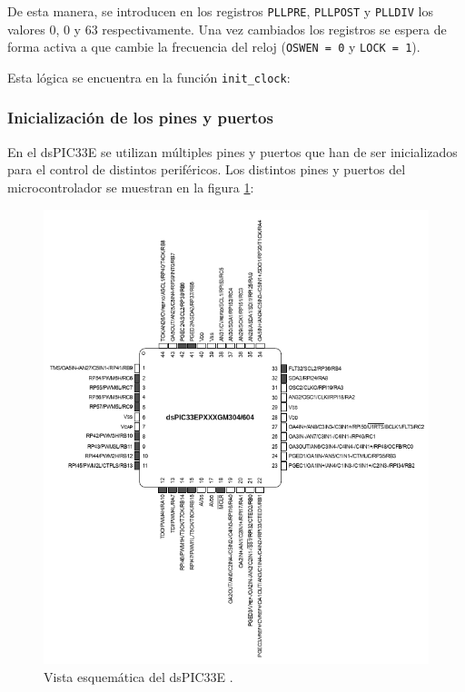 De esta manera, se introducen en los registros \texttt{PLLPRE}, \texttt{PLLPOST} y
\texttt{PLLDIV} los valores $0$, $0$ y $63$ respectivamente. Una vez cambiados los
registros se espera de forma activa a que cambie la frecuencia del reloj
(\texttt{OSWEN = 0} y \texttt{LOCK = 1}).

Esta lógica se encuentra en la función \texttt{init\_clock}:


\subsubsection{Inicialización de los pines y puertos}
En el dsPIC33E se utilizan múltiples pines y puertos que han de ser inicializados para
el control de distintos periféricos. Los distintos pines y puertos del microcontrolador
se muestran en la figura \ref{fig:dspic33e_upper}:

\begin{figure}[H]
    \centering
    \includegraphics[width=\linewidth]{pictures/dspic33e_upper.png}
    \caption{Vista esquemática del dsPIC33E \cite{datasheet.ex7759009FCCCDatasheetHoja}.}
    \label{fig:dspic33e_upper}
\end{figure}


